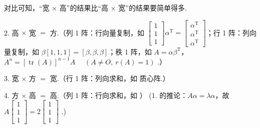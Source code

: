 对比可知，“宽 $\times$ 高”的结果比“高 $\times$ 宽”的结果要简单得多.

2. 高 $\times$ 宽 $=$ 方.（列 1 阵：行向量复制，如 $\begin{bmatrix}1\\1\\1\end{bmatrix}\alpha^{\mathrm T}=\begin{bmatrix}\alpha^{\mathrm T}\\\alpha^{\mathrm T}\\\alpha^{\mathrm T}\end{bmatrix}$；行 1 阵：列向量复制，如 $\beta[1,1,1]=[\beta,\beta,\beta]$；秩 1 阵，如 $A=\alpha\beta^{\mathrm T}$，$A^n=[\operatorname{tr}(A)]^{n-1}A$ $\quad(A\ne O,\ r(A)=1)$ .）

3. 宽 $\times$ 方 $=$ 宽.（行 1 阵：列向求和，如
质心阵.）

4. 方 $\times$ 高 $=$ 高.（列 1 阵：行向求和，如
）
\quad (1. 的推论：$A\alpha=\lambda\alpha$，故 $A\begin{bmatrix}1\\1\\1\end{bmatrix}=2\begin{bmatrix}1\\1\\1\end{bmatrix}$ .)

